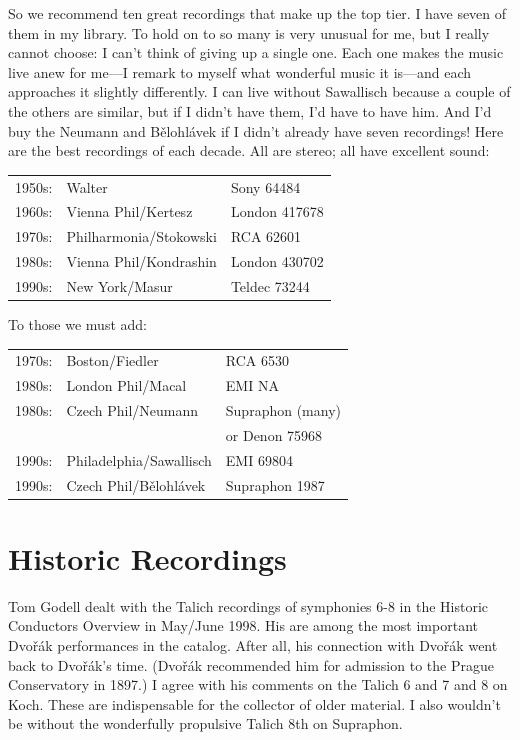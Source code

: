 \documentclass[12pt]{article}%
\begin{document}
So we recommend ten great recordings that make up the top tier. I have seven of them in my library. To hold on to so many is very unusual for me, but I really cannot choose: I can't think of giving up a single one. Each one makes the music live anew for me---I remark to myself what wonderful music it is---and each approaches it slightly differently. I can live without Sawallisch because a couple of the others are similar, but if I didn't have them, I'd have to have him. And I'd buy the Neumann and Bělohlávek if I didn't already have seven recordings!
Here are the best recordings of each decade.
All are stereo; all have excellent sound:

\begin{center}
\begin{tabular}{l l >{\raggedright\arraybackslash}p{2in}}
1950s: & Walter & Sony 64484\\
1960s:& Vienna Phil/Kertesz & London 417678\\
1970s:& Philharmonia/Stokowski &RCA 62601\\
1980s:& Vienna Phil/Kondrashin & London 430702\\
1990s: &  New York/Masur & Teldec 73244
\end{tabular}
\end{center}

\noindent
To those we must add:

\begin{center}
\begin{tabular}{l l >{\raggedright\arraybackslash}p{2in}}
1970s: &  Boston/Fiedler & RCA 6530\\
1980s: &  London Phil/Macal & EMI NA\\
1980s: & Czech Phil/Neumann & Supraphon (many)\\
&& or Denon 75968\\
1990s: &  Philadelphia/Sawallisch & EMI 69804\\
1990s: & Czech Phil/Bělohlávek & Supraphon 1987
\end{tabular}
\end{center}

\section{Historic Recordings}

Tom Godell dealt with the Talich recordings of symphonies 6-8 in the Historic Conductors Overview in May/June 1998. His are among the most important Dvořák performances in the
catalog. After all, his connection with Dvořák went back to Dvořák's time. (Dvořák recommended him for admission to the Prague Conservatory in 1897.) I agree with his comments on the Talich 6 and 7 and 8 on Koch.
These are indispensable for the collector of older material. I also wouldn't be without the wonderfully propulsive Talich 8th on Supraphon.
\end{document}
